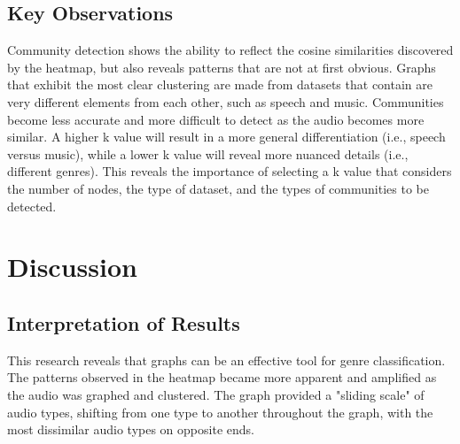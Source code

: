 \documentclass{article}
\begin{document}
\subsection{Key Observations}
Community detection shows the ability to reflect the cosine similarities discovered by the heatmap, but also reveals patterns that are not at first obvious. Graphs that exhibit the most clear clustering are made from datasets that contain are very different elements from each other, such as speech and music. Communities become less accurate and more difficult to detect as the audio becomes more similar. A higher k value will result in a more general differentiation (i.e., speech versus music), while a lower k value will reveal more nuanced details (i.e., different genres). This reveals the importance of selecting a k value that considers the number of nodes, the type of dataset, and the types of communities to be detected.

\section{Discussion}

\subsection{Interpretation of Results}
This research reveals that graphs can be an effective tool for genre classification. The patterns observed in the heatmap became more apparent and amplified as the audio was graphed and clustered. The graph provided a "sliding scale" of audio types, shifting from one type to another throughout the graph, with the most dissimilar audio types on opposite ends.
\end{document}
